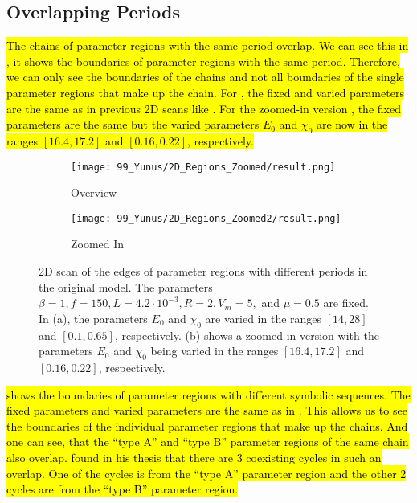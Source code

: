\subsection{Overlapping Periods}

\hl{
	The chains of parameter regions with the same period overlap.
	We can see this in , it shows the boundaries of parameter regions with the same period.
	Therefore, we can only see the boundaries of the chains and not all boundaries of the single parameter regions that make up the chain.
	For , the fixed and varied parameters are the same as in previous 2D scans like .
	For the zoomed-in version , the fixed parameters are the same but the varied parameters $E_0$ and $\chi_0$ are now in the ranges $[16.4, 17.2]$ and $[0.16, 0.22]$, respectively.
}

\begin{figure}
	\centering
	\begin{subfigure}{0.4\textwidth}
		\texttt{[image: 99\_Yunus/2D\_Regions\_Zoomed/result.png]}
		\caption{Overview}
		\label{fig:state.og.overlapping.chains.full}
	\end{subfigure}
	\begin{subfigure}{0.4\textwidth}
		\texttt{[image: 99\_Yunus/2D\_Regions\_Zoomed2/result.png]}
		\caption{Zoomed In}
		\label{fig:state.og.overlapping.chains.zoomed}
	\end{subfigure}
	\caption[2D scan of the edges of parameter regions with different periods in the original model]{
		2D scan of the edges of parameter regions with different periods in the original model.
		The parameters $\beta = 1, f = 150, L = 4.2 \cdot 10^{-3}, R = 2, V_m = 5,$ and $\mu = 0.5$ are fixed.
		In (a), the parameters $E_0$ and $\chi_0$ are varied in the ranges $[14, 28]$ and $[0.1, 0.65]$, respectively.
		(b) shows a zoomed-in version with the parameters $E_0$ and $\chi_0$ being varied in the ranges $[16.4, 17.2]$ and $[0.16, 0.22]$, respectively.
	}
	\label{fig:state.og.overlapping.chains}
\end{figure}

\hl{
	 shows the boundaries of parameter regions with different symbolic sequences.
	The fixed parameters and varied parameters are the same as in .
	This allows us to see the boundaries of the individual parameter regions that make up the chains.
	And one can see, that the ``type A'' and ``type B'' parameter regions of the same chain also overlap.
	 found in his thesis that there are 3 coexisting cycles in such an overlap.
	One of the cycles is from the ``type A'' parameter region and the other 2 cycles are from the ``type B'' parameter region.
}

